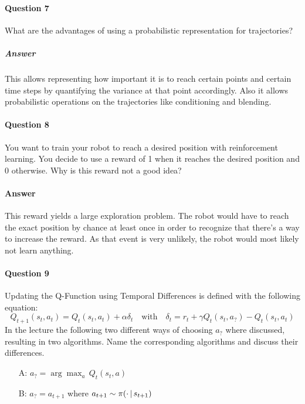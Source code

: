	\paragraph{Question 7}
		What are the advantages of using a probabilistic representation for trajectories?

		\subparagraph{Answer}
			This allows representing how important it is to reach certain points and certain time steps by quantifying the variance at that point accordingly. Also it allows probabilistic operations on the trajectories like conditioning and blending.

	\paragraph{Question 8}
		You want to train your robot to reach a desired position with reinforcement learning. You decide to use a reward of \num{1} when it reaches the desired position and \num{0} otherwise. Why is this reward not a good idea?

		\paragraph{Answer}
			This reward yields a large exploration problem. The robot would have to reach the exact position by chance at least once in order to recognize that there's a way to increase the reward. As that event is very unlikely, the robot would most likely not learn anything.

	\paragraph{Question 9}
		Updating the Q-Function using Temporal Differences is defined with the following equation:
		\begin{equation*}
			Q_{t + 1}(s_t, a_t) = Q_t(s_t, a_t) + \alpha \delta_t
			\quad\text{with}\quad
			\delta_t = r_t + \gamma Q_t(s_t, a_?) - Q_t(s_t, a_t)
		\end{equation*}
		In the lecture the following two different ways of choosing \(a_?\) where discussed, resulting in two algorithms. Name the corresponding algorithms and discuss their differences.
		\begin{itemize}
			\item[A:] \( a_? = \arg\max_a\, Q_t(s_t, a) \)
			\item[B:] \( a_? = a_{t + 1} \) where \( a_{t + 1} \sim \pi(\cdot \,\vert\, s_{t + 1}) \)
		\end{itemize}

